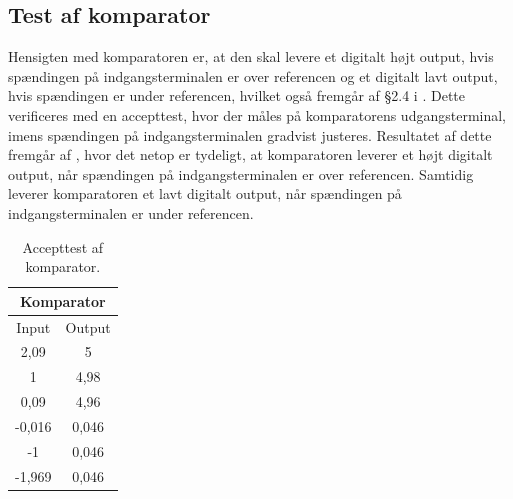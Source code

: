 \subsection{Test af komparator}
Hensigten med komparatoren er, at den skal levere et digitalt højt output, hvis spændingen på indgangsterminalen er over referencen og et digitalt lavt output, hvis spændingen er under referencen, hvilket også fremgår af §2.4 i . Dette verificeres med en accepttest, hvor der måles på komparatorens udgangsterminal, imens spændingen på indgangsterminalen gradvist justeres. Resultatet af dette fremgår af , hvor det netop er tydeligt, at komparatoren leverer et højt digitalt output, når spændingen på indgangsterminalen er over referencen. Samtidig leverer komparatoren et lavt digitalt output, når spændingen på indgangsterminalen er under referencen.
%
\begin{table}[H]
\centering
\begin{tabular}{|c|c|}
\hline
\multicolumn{2}{|c|}{Komparator} \\ \hline
Input           & Output         \\ \hline
2,09            & 5              \\ \hline
1               & 4,98           \\ \hline
0,09            & 4,96           \\ \hline
-0,016          & 0,046          \\ \hline
-1              & 0,046          \\ \hline
-1,969          & 0,046          \\ \hline
\end{tabular}
\caption{Accepttest af komparator.}
\label{tab:Komparator}
\end{table}
%
